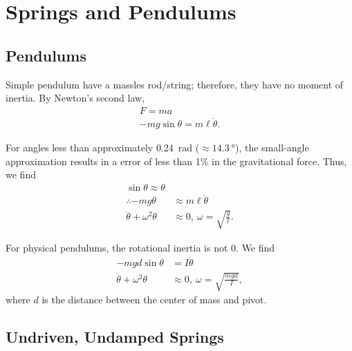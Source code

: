 \chapter{Springs and Pendulums}


\section{Pendulums}

Simple pendulum have a massles rod/string;
therefore, they have no moment of inertia.
By Newton's second law,
\begin{equation}
    \begin{aligned}
        F = m a \\
        -m g \sin \theta = m \ell \ddot{\theta}.
    \end{aligned}
\end{equation}

For angles less than approximately \qty{0.24}{\radian}
(\(\approx\qty{14.3}{\degree}\)),
the small-angle approximation results in a error of less than 1\% in
the gravitational force.
Thus, we find
\begin{align}
    \sin\theta \approx \theta \\
    \therefore - m g \theta            &\approx m \ell \ddot{\theta} \\
    \ddot{\theta} + \omega^2 \theta &\approx 0,~\omega = \sqrt{\frac{g}{\ell}}.
\end{align}

For physical pendulums, the rotational inertia is not 0.
We find
\begin{align}
    -m g d \sin\theta                &=       I \ddot{\theta} \\
    \ddot{\theta} + \omega^2\theta &\approx 0,~\omega = \sqrt{\frac{mgd}{I}},
\end{align}
where \(d\) is the distance between the center of mass and pivot.

\section{Undriven, Undamped Springs}

